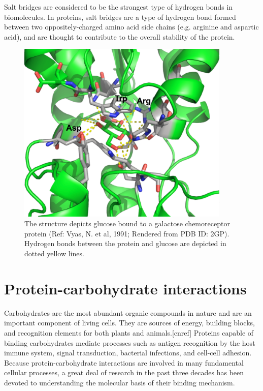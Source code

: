 Salt bridges are considered to be the strongest type of hydrogen bonds in biomolecules.  In proteins, salt bridges are a type of hydrogen bond formed between two oppositely-charged amino acid side chains (e.g. arginine and aspartic acid), and are thought to contribute to the overall stability of the protein.\cite{Nakamura:1996vm,Pace:2000eg}

\begin{figure}
 \centering
 \includegraphics[width=4in]{figures/introduction/sugar_protein_binding.pdf}
 \caption[An example of sugar-lectin binding]{The structure depicts glucose bound to a galactose chemoreceptor protein (Ref: Vyas, N. et al, 1991; Rendered from PDB ID: 2GP). Hydrogen bonds between the protein and glucose are depicted in dotted yellow lines. }
 \label{fig:sugar_protein}
\end{figure}

\section{Protein-carbohydrate interactions}
Carbohydrates are the most abundant organic compounds in nature and are an important component of living cells.  They are sources of energy, building blocks, and recognition elements for both plants and animals.[cnref]  Proteins capable of binding carbohydrates mediate processes such as antigen recognition by the host immune system,\cite{vanRozendaal:2000fi,Reid:1998tw} signal transduction,\cite{Rudd:2001te} bacterial infections,\cite{Karlsson:1999ta} and cell-cell adhesion.\cite{Rogers:1983wp} 
Because protein-carbohydrate interactions are involved in many fundamental cellular processes, a great deal of research in the past three decades has been devoted to understanding the molecular basis of their binding mechanism. 

